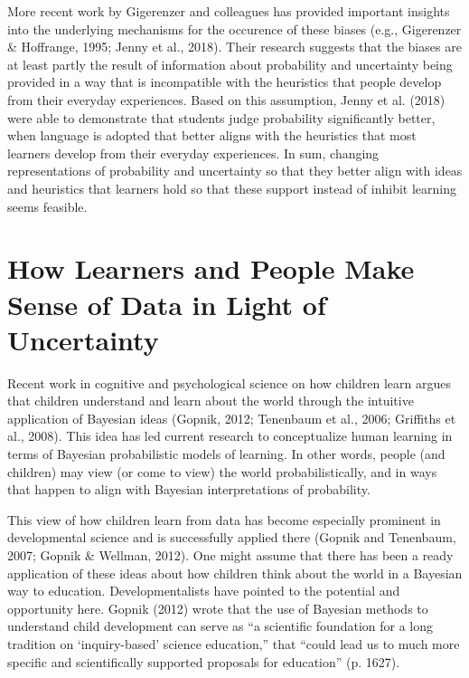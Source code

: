 \documentclass[man]{apa7}
\begin{document}
More recent work by Gigerenzer and colleagues has provided important insights into the underlying mechanisms for the occurence of these biases (e.g., Gigerenzer & Hoffrange, 1995; Jenny et al., 2018). Their research suggests that the biases are at least partly the result of information about probability and uncertainty being provided in a way that is incompatible with the heuristics that people develop from their everyday experiences. Based on this assumption, Jenny et al. (2018) were able to demonstrate that students judge probability significantly better, when language is adopted that better aligns with the heuristics that most learners develop from their everyday experiences. In sum, changing representations of probability and uncertainty so that they better align with ideas and heuristics that learners hold so that these support instead of inhibit learning seems feasible. 

\section{How Learners and People Make Sense of Data in Light of Uncertainty}

Recent work in cognitive and psychological science on how children learn argues that children understand and learn about the world through the intuitive application of Bayesian ideas (Gopnik, 2012; Tenenbaum et al., 2006; Griffiths et al., 2008). This idea has led current research to conceptualize human learning in terms of Bayesian probabilistic models of learning. In other words, people (and children) may view (or come to view) the world probabilistically, and in ways that happen to align with Bayesian interpretations of probability.

This view of how children learn from data has become especially prominent in developmental science and is successfully applied there (Gopnik and Tenenbaum, 2007; Gopnik & Wellman, 2012). One might assume that there has been a ready application of these ideas about how children think about the world in a Bayesian way to education. Developmentalists have pointed to the potential and opportunity here. Gopnik (2012) wrote that the use of Bayesian methods to understand child development can serve as “a scientific foundation for a long tradition on ‘inquiry-based’ science education,” that “could lead us to much more specific and scientifically supported proposals for education” (p. 1627).  
\end{document}

